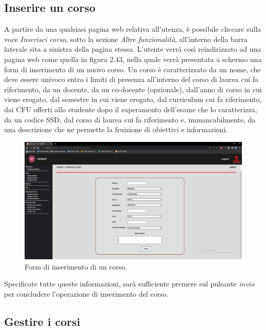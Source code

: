 \documentclass [a4paper,11pt]{book}
\begin{document}
\medskip

\subsection{Inserire un corso}

A partire da una qualsiasi pagina web relativa all'utenza, è possibile cliccare sulla voce \emph{Inserisci corso}, sotto la sezione \emph{Altre funzionalità}, all'interno della barra laterale sita a sinistra della pagina stessa. L'utente verrà così reindirizzato ad una pagina web come quella in figura 2.43, nella quale verrà presentata a schermo una form di inserimento di un nuovo corso. Un corso è caratterizzato da un nome, che deve essere univoco entro i limiti di presenza all'interno del corso di laurea cui fa riferimento, da un docente, da un co-docente (opzionale), dall'anno di corso in cui viene erogato, dal semestre in cui viene erogato, dal curriculum cui fa riferimento, dai CFU offerti allo studente dopo il superamento dell'esame che lo caratterizza, da un codice SSD, dal corso di laurea cui fa riferimento e, immancabilmente, da una descrizione che ne permette la fruizione di obiettivi e informazioni.

\begin{figure}
\centering
\includegraphics[scale=0.3]{figura2-43.png}
\caption{Form di inserimento di un corso.}
\end{figure}

Specificate tutte queste informazioni, sarà sufficiente premere sul pulsante \emph{invio} per concludere l'operazione di inserimento del corso.

\medskip

\subsection{Gestire i corsi}
\end{document}
